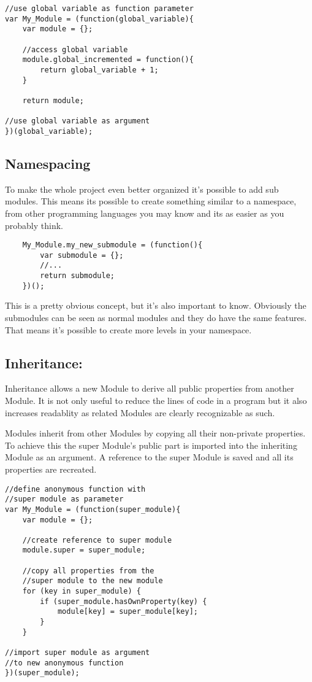 \documentclass{bioinfo}
\begin{document}
\begin{lstlisting}
//use global variable as function parameter
var My_Module = (function(global_variable){
	var module = {};

	//access global variable
	module.global_incremented = function(){
		return global_variable + 1;
	}

	return module;

//use global variable as argument
})(global_variable);
\end{lstlisting}

\subsection{Namespacing}
To make the whole project even better organized it's possible to add sub modules.
This means its possible to create something similar to a namespace, from
other programming languages you may know and its as easier as you probably think.

\begin{lstlisting}
    My_Module.my_new_submodule = (function(){
    	var submodule = {};
        //...
        return submodule;
    })();
\end{lstlisting}

This is a pretty obvious concept, but it's also important to know. Obviously the
submodules can be seen as normal modules and they do have the same features. That means
it's possible to create more levels in your namespace.

\subsection{Inheritance:}

Inheritance allows a new Module to derive all public properties from another Module. It is not only useful to reduce the lines of code in a program but it also increases readablity as related Modules are clearly recognizable as such.\vspace{\baselineskip}


Modules inherit from other Modules by copying all their non-private properties. To achieve this the super Module's public part is imported into the inheriting Module as an argument. A reference to the super Module is saved and all its properties are recreated.\vspace{\baselineskip}

\begin{lstlisting}
//define anonymous function with
//super module as parameter
var My_Module = (function(super_module){
	var module = {};

	//create reference to super module
	module.super = super_module;

	//copy all properties from the
	//super module to the new module
	for (key in super_module) {
		if (super_module.hasOwnProperty(key) {
			module[key] = super_module[key];
		}
	}

//import super module as argument
//to new anonymous function
})(super_module);
\end{lstlisting}
\end{document}
